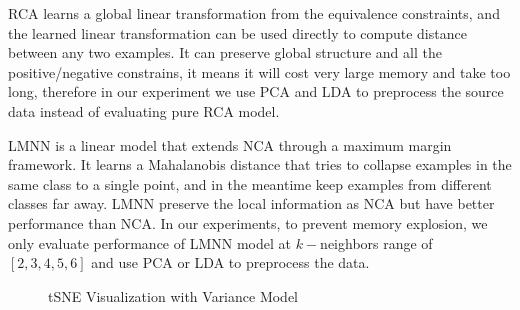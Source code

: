 \documentclass[conference]{IEEEtran}
\begin{document}
RCA learns a global linear transformation from the equivalence constraints, and the learned linear transformation can be used directly to compute distance between any two examples. It can preserve global structure and all the positive/negative constrains, it means it will cost very large memory and take too long, therefore in our experiment we use PCA and LDA to preprocess the source data instead of evaluating pure RCA model.

LMNN is a linear model that extends NCA through a maximum margin framework. It learns a Mahalanobis distance that tries to collapse examples in the same class to a single point, and in the meantime keep examples from different classes far away. LMNN preserve the local information as NCA but have better performance than NCA. In our experiments, to prevent memory explosion, we only evaluate performance of LMNN model at $k-$neighbors range of $[2,3,4,5,6]$ and use PCA or LDA to preprocess the data.

\begin{center}
\begin{figure}
\centering
{}
\quad
{}
\quad
{}
\quad
{}
\caption{tSNE Visualization with Variance Model}
\label{Fig2}
\end{figure}
\end{center}


\end{document}
